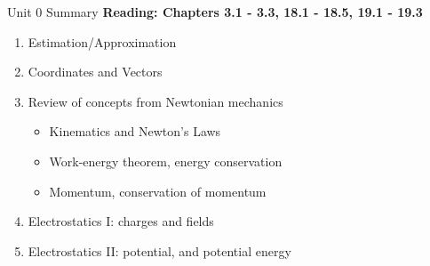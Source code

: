 \documentclass{beamer}
\begin{document}
\begin{frame}{Unit 0 Summary}
\textbf{Reading: Chapters 3.1 - 3.3, 18.1 - 18.5, 19.1 - 19.3}
\begin{enumerate}
\item Estimation/Approximation
\item Coordinates and Vectors
\item Review of concepts from Newtonian mechanics
\begin{itemize}
\item Kinematics and Newton's Laws
\item Work-energy theorem, energy conservation
\item Momentum, conservation of momentum
\end{itemize}
\item Electrostatics I: charges and fields
\item Electrostatics II: potential, and potential energy
\end{enumerate}
\end{frame}
\end{document}
